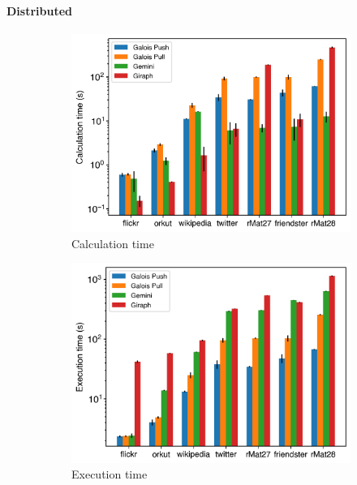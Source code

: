 \paragraph{Distributed}
\begin{figure}
	\hfil
	\begin{subfigure}{0.32\textwidth}
		\includegraphics[width=\linewidth]{../../plots/distributedBFS_calcTime.png}
		\caption{Calculation time}
		\label{fig:distributedBFS_calc}
	\end{subfigure}
	\hfil
	\begin{subfigure}{0.32\textwidth}
		\includegraphics[width=\linewidth]{../../plots/distributedBFS_execTime.png}
		\caption{Execution time}
		\label{fig:distributedBFS_exec}
	\end{subfigure}
	\hfil
	\begin{subfigure}{0.32\textwidth}

\end{subfigure}
\end{figure}
